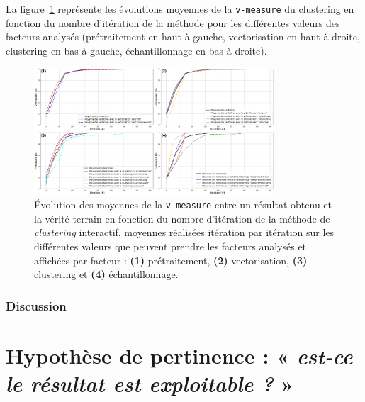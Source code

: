 			
				La figure~\ref{figure:4.2.1-ETUDE-CONVERGENCE-EVOLUTION-PAR-FACTEURS} représente les évolutions moyennes de la \texttt{v-measure} du clustering en fonction du nombre d'itération de la méthode pour les différentes valeurs des facteurs analysés (prétraitement en haut à gauche, vectorisation en haut à droite, clustering en bas à gauche, échantillonnage en bas à droite).
				\begin{figure}[H]
					\centering
					\includegraphics[width=0.8\textwidth]{figures/etude-convergence-evolution-moyenne-par-iteration-par-facteur}
					\caption{Évolution des moyennes de la \texttt{v-measure} entre un résultat obtenu et la vérité terrain en fonction du nombre d'itération de la méthode de \textit{clustering} interactif, moyennes réalisées itération par itération sur les différentes valeurs que peuvent prendre les facteurs analysés et affichées par facteur : \textbf{(1)} prétraitement, \textbf{(2)} vectorisation, \textbf{(3)} clustering et \textbf{(4)} échantillonnage.}
					\label{figure:4.2.1-ETUDE-CONVERGENCE-EVOLUTION-PAR-FACTEURS}
				\end{figure}

			\subsubsection{Discussion}
	

    \section{Hypothèse de pertinence : « \textit{est-ce le résultat est exploitable ?} »}
	\label{section:4.3-HYPOTHESE-PERTINENCE}
	

